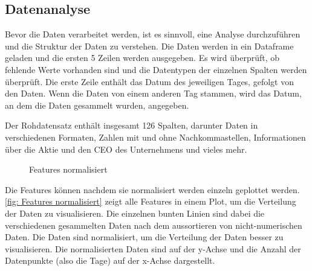 \subsection{Datenanalyse} \label{sec:Datenanalyse}
Bevor die Daten verarbeitet werden, ist es sinnvoll, eine Analyse durchzuführen und die Struktur der Daten zu verstehen. Die Daten werden in ein Dataframe geladen und die ersten 5 Zeilen werden ausgegeben. Es wird überprüft, ob fehlende Werte vorhanden sind und die Datentypen der einzelnen Spalten werden überprüft. Die erste Zeile enthält das Datum des jeweiligen Tages, gefolgt von den Daten. Wenn die Daten von einem anderen Tag stammen, wird das Datum, an dem die Daten gesammelt wurden, angegeben. 
\par
Der Rohdatensatz enthält insgesamt 126 Spalten, darunter Daten in verschiedenen Formaten, Zahlen mit und ohne Nachkommastellen, Informationen über die Aktie und den CEO des Unternehmens und vieles mehr.
\begin{figure}[H]
    \centering
    \caption{Features normalisiert}
    \label{fig: Features normalisiert}
\end{figure}
Die Features können nachdem sie normalisiert werden einzeln geplottet werden. \autoref{fig: Features normalisiert} zeigt alle Features in einem Plot, um die Verteilung der Daten zu visualisieren. Die einzelnen bunten Linien sind dabei die verschiedenen gesammelten Daten nach dem aussortieren von nicht-numerischen Daten. Die Daten sind normalisiert, um die Verteilung der Daten besser zu visualisieren. Die normalisierten Daten sind auf der y-Achse und die Anzahl der Datenpunkte (also die Tage) auf der x-Achse dargestellt.

